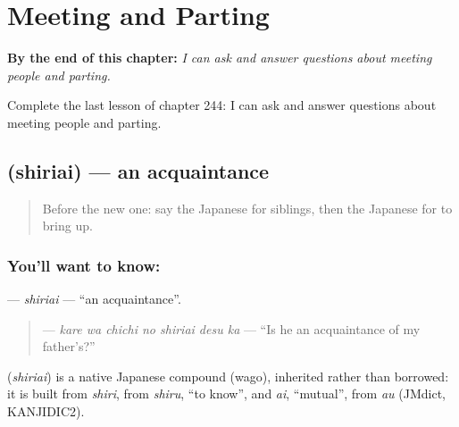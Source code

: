 
\chapter{Meeting and Parting}
\label{ch:ja-meeting-and-parting}

\begin{chapteropening}
\textbf{By the end of this chapter:} \emph{I can ask and answer questions about meeting people and parting.}

Complete the last lesson of chapter 244: I can ask and answer questions about meeting people and parting.
\end{chapteropening}

\section[\texorpdfstring{\ja{しりあい} (shiriai)}{しりあい (shiriai)}]{ (shiriai) — an acquaintance}

\label{lesson:JA-C244-shiriai}



\begin{quote}
Before the new one: say the Japanese for siblings, then the Japanese for to bring up.
\end{quote}

\subsection*{You'll want to know: }
\textbf{} — \emph{shiriai} — \textquotedblleft{}an acquaintance\textquotedblright{}.

\begin{quote}
\textbf{  } — \emph{kare wa chichi no shiriai desu ka} — \textquotedblleft{}Is he an acquaintance of my father's?\textquotedblright{}
\end{quote}

\begin{cousinweb}
\textbf{} (\emph{shiriai}) is a native Japanese compound (wago), inherited rather than borrowed: it is built from \emph{shiri}, from \emph{shiru}, \textquotedblleft{}to know\textquotedblright{}, and \emph{ai}, \textquotedblleft{}mutual\textquotedblright{}, from \emph{au} (JMdict, KANJIDIC2).
\end{cousinweb}

